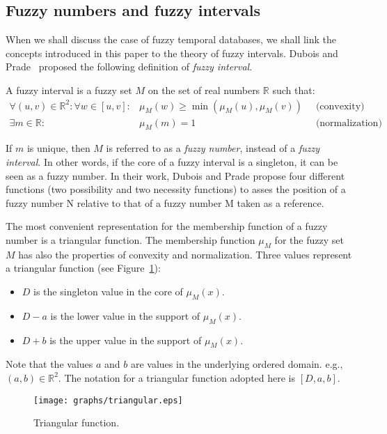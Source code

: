 \subsection{\label{subsubsec:fuzzy}Fuzzy numbers and fuzzy intervals}
When we shall discuss the case of fuzzy temporal databases, we shall link the concepts introduced in this paper to the theory of fuzzy intervals. Dubois and Prade~\cite{Dubois1983} proposed the following definition of \emph{fuzzy interval}.
\begin{definition}
A fuzzy interval is a fuzzy set $M$ on the set of real numbers $\mathbb{R}$ such that:
\begin{eqnarray}
\forall (u,v)\in\mathbb{R}^2:\forall w \in [u,v]:&\mu_M(w) \geq\min(\mu_M(u),\mu_M(v)) \ &\mbox{ (convexity) } \\
\exists m \in \mathbb{R}:& \mu_M(m)=1 \ &\mbox{ (normalization) }
\end{eqnarray}
\end{definition}
If $m$ is unique, then $M$ is referred to as a \emph{fuzzy number}, instead of a \emph{fuzzy interval}. In other words, if the core of a fuzzy interval is a singleton, it can be seen as a fuzzy number. In their work, Dubois and Prade propose four different functions (two possibility and two necessity functions) to asses the position of a fuzzy number N relative to that of a fuzzy number M taken as a reference.

The most convenient representation for the membership function of a fuzzy number is a triangular function. The membership function $\mu_M$ for the fuzzy set $M$ has also the properties of convexity and normalization. Three values represent a triangular function (see Figure~\ref{fig:triangular}):
\begin{itemize}
\item
$D$ is the singleton value in the core of $\mu_M(x)$.
\item
$D-a$ is the lower value in the support of $\mu_M(x)$. 
\item
$D+b$ is the upper value in the support of $\mu_M(x)$.
\end{itemize}
Note that the values $a$ and $b$ are values in the underlying ordered domain. e.g., $(a,b) \in \mathbb{R}^2$. The notation for a triangular function adopted here is $[D,a,b]$.
\begin{figure}[h!]
  \centering
  \texttt{[image: graphs/triangular.eps]}
  \caption{Triangular function.}
  \label{fig:triangular}
\end{figure}

